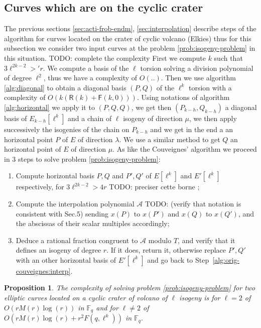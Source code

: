 \documentclass{lms}
\newcommand{\todo}[1]{{\color{red}TODO: #1}}
\newtheorem{prop}[thm]{Proposition}
\begin{document}
 \subsection{Curves which are on the cyclic crater}
  The previous sections \ref{sec:acti-frob-endm}, \ref{sec:interpolation} describe steps of the algorithm for curves located on the crater of cyclic volcano (Elkies) thus for this subsection we consider two input curves at the problem \ref{prob:isogeny-problem} in this situation. 
\newline
\todo{complete the complexity}
 First we compute $k$ such that $3\ell^{2k-2}>'r$. We compute a basis of the $\ell$ torsion solving a division polynomial of degree $\ell^2$, thus we have a complexity of $O(..)$.%
 Then we use algorithm \ref{alg:diagonal} to obtain a diagonal basis $(P,Q)$ of the $\ell^k$ torsion with a complexity of $O(k(\mathsf{R}(k)+\mathsf{F}(k,0)))$. Using notations of algorithm \ref{alg:horizontal} we apply it to $(P,Q,Q)$, we get then $(P_{k-h},Q_{k-h})$ a diagonal basis of $E_{k-h}[\ell^k]$ and a chain of $\ell$ isogeny of direction $\mu$, we then apply successively the isogenies of the chain on $P_{k-h}$ and we get in the end a an horizontal point $P$ of $E$ of direction $\lambda$. We use a similar method to get $Q$ an horizontal point of $E$ of direction $\mu$.  
\newline  
  As like the Couveignes' algorithm we proceed in 3 steps to solve problem \ref{prob:isogeny-problem}:
 \begin{enumerate}
\item Compute horizontal basis $P,Q$ and $P',Q'$ of
  $E[\ell^k]$ and $E'[\ell^k]$ respectively, for $3\ell^{2k-2} > 4r$ \todo{preciser cette borne} ;
\item\label{alg:modif-couveignes:interp} Compute the interpolation
  polynomial $\mathcal{A}$ \todo{(verify that notation is consistent
    with Sec.5)} sending $x(P)$ to $x(P')$ and $x(Q)$ to $x(Q')$, and the abscissas of
  their scalar multiples accordingly;
\item\label{alg:modif-couveignes:rational} Deduce a rational fraction
  congruent to $\mathcal{A}$ modulo $T$, and verify that it
  defines an isogeny of degree $r$. If it does, return it, otherwise
  replace $P',Q'$ with an other horizontal basis of $E'[\ell^k]$ and go back to
  Step~\ref{alg:orig-couveignes:interp}.
\end{enumerate} 

\begin{prop}
The complexity of solving problem \ref{prob:isogeny-problem} for two elliptic curves located on a cyclic crater of volcano of $\ell$ isogeny is for $\ell=2$ of $O(rM(r)\log(r))$ in $\mathbb{F}_q$ and for $\ell \neq 2$ of $O(rM(r)\log(r)+r^2F(q,\ell^k))$ in $\mathbb{F}_q$.
\end{prop}
\end{document}
